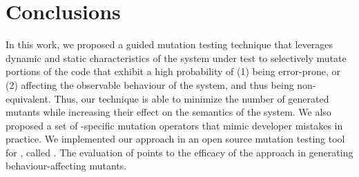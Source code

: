 \section{Conclusions}
In this work, we proposed a guided mutation testing technique that leverages dynamic and static characteristics of the system under test to selectively mutate portions of the code that exhibit a high probability of (1) being error-prone, or (2) affecting the observable behaviour of the system, and thus being non-equivalent. Thus, our technique is able to minimize the number of generated mutants while increasing their effect on the semantics of the system. 
We also proposed a set of \javascript-specific mutation operators that mimic developer mistakes in practice.
We implemented our approach in an open source mutation testing tool for \javascript, called \mutandis.  
The evaluation of \mutandis points to the efficacy of the approach in generating behaviour-affecting mutants.






